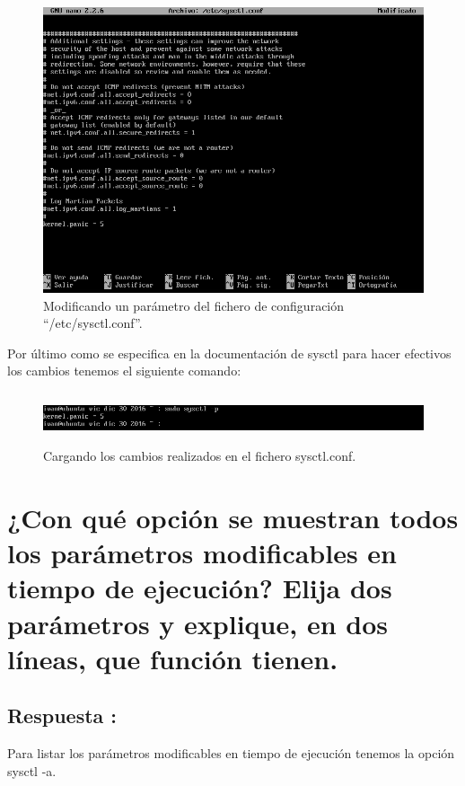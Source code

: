 \begin{figure}[H]
	\begin{center}
		\includegraphics[width=15cm]{Imagenes/Anadiendo_valor_a_sysctl}
		\caption{Modificando un parámetro del fichero de configuración ``/etc/sysctl.conf''.}
		\label{fig:2}
	\end{center}
\end{figure}

Por último como se especifica en la documentación de sysctl para hacer efectivos los cambios tenemos el siguiente comando:

\begin{figure}[H]
	\begin{center}
		\includegraphics[width=15cm, height=1.5cm]{Imagenes/Sysctl_efectivos_cambios}
		\caption{Cargando los cambios realizados en el fichero sysctl.conf.}
		\label{fig:3}
	\end{center}
\end{figure}

\section{¿Con qué opción se muestran todos los parámetros modificables en tiempo de ejecución? Elija dos parámetros y explique, en dos líneas, que función tienen.}
\subsection{Respuesta : }
Para listar los parámetros modificables en tiempo de ejecución tenemos la opción sysctl -a. \cite{SYSCTL}

